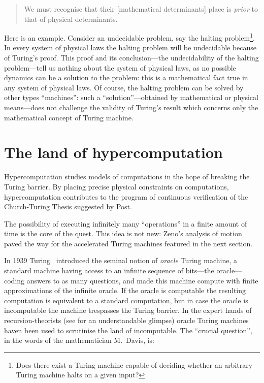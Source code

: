\documentclass{comjnl}
\begin{document}
\begin{quote}
We must recognise that their [mathematical determinants] place is {\em prior} to that of physical determinants.
\end{quote}
\noindent Here is an example. Consider an undecidable problem, say the halting problem\footnote{Does there exist a Turing machine capable of deciding whether
an arbitrary Turing machine halts on a given input?}. In every system of physical laws the halting problem will
be undecidable  because of Turing's proof. This proof and its conclusion---the undecidability of the halting problem---tell us nothing about  the system of physical laws, as
no possible dynamics can be a solution to the problem: this is a mathematical fact true in any system of physical laws.
Of course, the halting problem can be solved by other types ``machines'': such a ``solution''---obtained by mathematical or physical means---does not challenge the validity of Turing's result which concerns only the mathematical concept of Turing machine.


\section{The land of hypercomputation}
Hypercomputation  studies models of computations in the hope of breaking the Turing barrier.  By placing precise physical constraints on computations, hypercomputation contributes to the program of
continuous verification of the Church-Turing Thesis suggested by Post.

 The possibility of executing infinitely many ``operations'' in a finite amount of time is the core
 of the quest. This idea is not new:  Zeno's analysis of motion paved the way for the accelerated Turing machines featured in the next section.

 In 1939 Turing~\cite{turing-1939} introduced the seminal notion of {\em oracle} Turing machine, a standard machine having access to an infinite sequence of bits---the oracle---coding answers to as many questions, and made this  machine compute with finite approximations of the infinite oracle. If the oracle
 is computable the resulting computation is equivalent to a standard computation, but in case the oracle is incomputable the machine trespasses the Turing barrier. In the expert hands of recursion-theorists (see \cite{cooper-2003} for an understandable glimpse) oracle Turing machines haven been used to scrutinise the land of incomputable.  The  ``crucial question'', in the words of the mathematician M.~Davis,  is:
\end{document}
